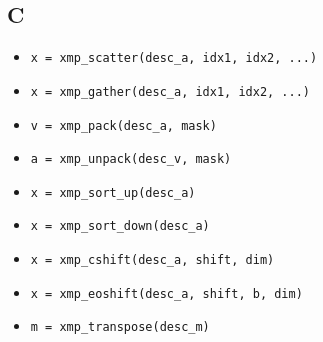 \subsection{C}


\begin{itemize}
 \item {\tt x = xmp\_scatter(desc\_a, idx1, idx2, ...)}
 \item {\tt x = xmp\_gather(desc\_a, idx1, idx2, ...)}
 \item {\tt v = xmp\_pack(desc\_a, mask)}
 \item {\tt a = xmp\_unpack(desc\_v, mask)}
 \item {\tt x = xmp\_sort\_up(desc\_a)}
 \item {\tt x = xmp\_sort\_down(desc\_a)}
 \item {\tt x = xmp\_cshift(desc\_a, shift, dim)}
 \item {\tt x = xmp\_eoshift(desc\_a, shift, b, dim)}
 \item {\tt m = xmp\_transpose(desc\_m)}
\end{itemize}
